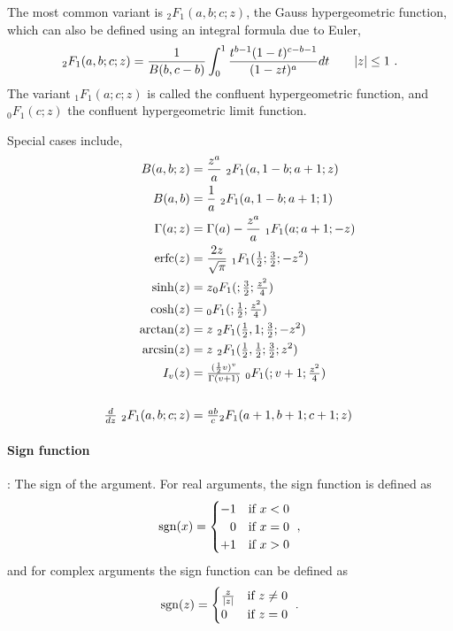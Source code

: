 The most common variant is ${}_2 F_1 (a,b;c;z)$, the Gauss hypergeometric function, which can also be defined using an integral formula due to Euler, 
\[
{}_2 F_1 (a,b;c;z) = \frac{1}{B(b,c-b)} \int_0^1 \frac{t^{b-1} (1-t)^{c-b-1} }{ (1- z t)^a } dt \qquad |z|\leq 1
\checked
\ .
\]
The variant ${}_1 F_1 (a;c;z)$ is called the confluent hypergeometric function,
and ${}_0 F_1 (c;z)$ the confluent hypergeometric limit function.



Special cases include,
\begin{align*}
B(a,b;z) &= \frac{z^a}{a}\  {}_2 F_1(a,1-b;a+1;z						\checked) \\
B(a,b) &= \frac{1}{a}\ {}_2 F_1(a,1-b;a+1;1) 							\checked\\
\Gamma(a;z) &= \Gamma(a)- \frac{z^a}{a}\  {}_1 F_1(a; a+1;-z) 			\checked \\
\op{erfc}(z) & = \frac{2 z}{\sqrt{\pi} }\  {}_1 F_1(\tfrac{1}{2}; \tfrac{3}{2} ;-z^2)	\checked \\
 \sinh(z) & = z {}_0 F_1(; \tfrac{3}{2};\tfrac{z^2}{4} ) 						\checked \\		
 \cosh(z) & = {}_0 F_1(; \tfrac{1}{2};\tfrac{z^2}{4} ) 						\checked \\
\op{arctan}(z)& = z\ {}_2 F_1( \tfrac{1}{2},  1 ;  \tfrac{3}{2}; - z^2) 			\checked \\
\op{arcsin}(z)& = z\ {}_2 F_1( \tfrac{1}{2},  \tfrac{1}{2} ;  \tfrac{3}{2}; z^2) 	\checked \\
I_v(z) & = \sfrac{( \half v)^v}{\Gamma(v+1)}\ {}_0 F_1(; v+1;\tfrac{z^2}{4} ) \checked \\
\\
\tfrac{d}{dz}\ {}_2 F_1 (a,b;c;z) & = \tfrac{a b}{c} {}_2 F_1  (a+1,b+1;c+1;z) 	\checked
\end{align*}


\paragraph*{Sign function}\hspace{-0.8em}:
The sign of the argument. For real arguments, the sign function is defined as 
\begin{align*}	
 \operatorname{sgn}(x)  = \begin{cases}
-1 & \text{if } x < 0 \\
\phantom{+}0 & \text{if } x = 0 \\
+1 & \text{if } x > 0  \end{cases}	 \ , 
\end{align*}
and for complex arguments the sign function can be defined as
\begin{align*}	
 \operatorname{sgn}(z) = \begin{cases}
\tfrac{z}{|z|} & \text{if } z \neq 0 \\
0 & \text{if } z = 0
\end{cases}	\ .
\end{align*}


